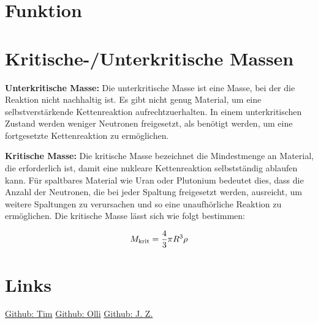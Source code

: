 \documentclass[a4paper,12pt]{article}
\begin{document}
\newpage

\section{Funktion}
\hypertarget{implosion_section}{}
\hypertarget{gun_section}{}

\section{Kritische-/Unterkritische Massen}
\textbf{Unterkritische Masse:}
Die unterkritische Masse ist eine Masse, bei der die Reaktion nicht nachhaltig ist. Es gibt nicht genug Material, um eine selbstverstärkende Kettenreaktion aufrechtzuerhalten. In einem unterkritischen Zustand werden weniger Neutronen freigesetzt, als benötigt werden, um eine fortgesetzte Kettenreaktion zu ermöglichen.

\vspace*{2cm}

\noindent\textbf{Kritische Masse:}
Die kritische Masse bezeichnet die Mindestmenge an Material, die erforderlich ist, damit eine nukleare Kettenreaktion selbstständig ablaufen kann. Für spaltbares Material wie Uran oder Plutonium bedeutet dies, dass die Anzahl der Neutronen, die bei jeder Spaltung freigesetzt werden, ausreicht, um weitere Spaltungen zu verursachen und so eine unaufhörliche Reaktion zu ermöglichen.
Die kritische Masse lässt sich wie folgt bestimmen:

\begin{equation}
    \fontsize{20}{10}
    M_\text{krit} = \frac{4}{3} \pi R^3 \rho
    \label{eq:kritische_masse}
\end{equation}

\newpage

\section{Links}
\begin{center}
\end{center}
\bigskip

\href{https://github.com/Tim-foe}{Github: Tim} \hspace{4cm}
\href{https://github.com/YoOlli}{Github: Olli} \hspace{4cm}
\href{https://github.com/Jason4225}{Github: J. Z.}

%
%
\end{document}
